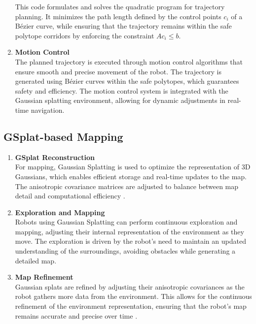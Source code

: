 \begin{enumerate}
            This code formulates and solves the quadratic program for trajectory planning.
            It minimizes the path length defined by the control points \( c_i \) of a
            Bézier curve, while ensuring that the trajectory remains within the safe
            polytope corridors by enforcing the constraint \( A c_i \leq b \).

      \item \textbf{Motion Control} \\
            The planned trajectory is executed through motion control algorithms that ensure smooth and precise movement of the robot. \cite{DURAKLI2022101540} The trajectory is generated using Bézier curves within the safe polytopes, which guarantees safety and efficiency. The motion control system is integrated with the Gaussian splatting environment, allowing for dynamic adjustments in real-time navigation.

\end{enumerate}

\subsection{GSplat-based Mapping}
\begin{enumerate}
      \item \textbf{GSplat Reconstruction} \\
            For mapping, Gaussian Splatting is used to optimize the representation of 3D Gaussians, which enables efficient storage and real-time updates to the map. The anisotropic covariance matrices are adjusted to balance between map detail and computational efficiency \cite{kerbl20233dgaussiansplattingrealtime}.

      \item \textbf{Exploration and Mapping} \\
            Robots using Gaussian Splatting can perform continuous exploration and mapping, adjusting their internal representation of the environment as they move. The exploration is driven by the robot's need to maintain an updated understanding of the surroundings, avoiding obstacles while generating a detailed map.

      \item \textbf{Map Refinement} \\
            Gaussian splats are refined by adjusting their anisotropic covariances as the robot gathers more data from the environment. This allows for the continuous refinement of the environment representation, ensuring that the robot's map remains accurate and precise over time \cite{kerbl20233dgaussiansplattingrealtime}.

\end{enumerate}


